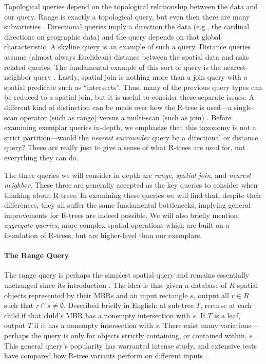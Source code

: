 Topological queries depend on the topological relationship between the data and our query.
Range is exactly a topological query, but even then there are many subvarieties \cite{papadiassellistheodoridisegenhofer95,gaedegunther98}.
Directional queries imply a direction the data (e.g., the cardinal directions on geographic data) and the query depends on that global characteristic.
A skyline query \cite{papadiastaofuseeger05} is an example of such a query.
Distance queries assume (almost always Euclidean) distance between the spatial data and asks related queries.
The fundamental example of this sort of query is the nearest-neighbor query \cite{roussopouloskelleyvincent95}.
Lastly, spatial join is nothing more than a join query with a spatial predicate \cite{brinkhoffkriegelseeger93} such as ``intersects''.
Thus, many of the previous query types can be reduced to a spatial join, but it is useful to consider these separate issues.
A different kind of distinction can be made over how the R-tree is used---a single-scan operator (such as range) versus a multi-scan (such as join) \cite{brinkhoffkriegelseeger93,samet90}.
Before examining exemplar queries in-depth, we emphasize that this taxonomy is not a strict partition---would the \emph{nearest surrounder} query \cite{leeleeleong10} be a directional or distance query?
These are really just to give a sense of what R-trees are used for, not everything they can do.

The three queries we will consider in depth are \emph{range}, \emph{spatial join}, and \emph{nearest neighbor}.
These three are generally accepted as the key queries to consider when thinking about R-trees.
In examining these queries we will find that, despite their differences, they all suffer the same fundamental bottlenecks, implying general improvements for R-trees are indeed possible.
We will also briefly mention \emph{aggregate queries}, more complex spatial operations which are built on a foundation of R-trees, but are higher-level than our exemplars.

\paragraph{The Range Query}
The range query is perhaps the simplest spatial query and remains essentially unchanged since its introduction \cite{guttman84}.
The idea is this: given a database of $R$ spatial objects represented by their MBRs and an input rectangle $s$, output all $r\in R$ such that $r\cap s\neq\emptyset$.
Described briefly in English: at sub-tree $T$, recurse at each child if that child's MBR has a nonempty intersection with $s$.
If $T$ is a leaf, output $T$ if it has a nonempty intersection with $s$.
There exist many variations---perhaps the query is only for objects strictly containing, or contained within, $s$ \cite{gaedegunther98}.
This general query's popularity has warranted intense study, and extensive tests have compared how R-tree variants perform on different inputs \cite{papadiassellistheodoridisegenhofer95}.

